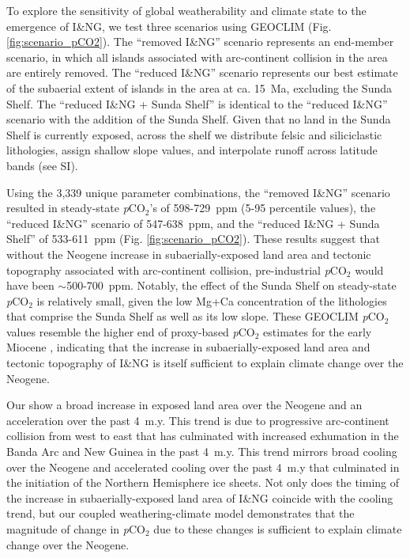 \documentclass[11pt,letterpaper]{article}
\newcommand{\pCOtwo}{\textit{p}CO$_{2}$\xspace}
\begin{document}
To explore the sensitivity of global weatherability and climate state to the emergence of I\&NG, we test three scenarios using GEOCLIM (Fig. \ref{fig:scenario_pCO2}). The ``removed I\&NG'' scenario represents an end-member scenario, in which all islands associated with arc-continent collision in the area are entirely removed. The ``reduced I\&NG'' scenario represents our best estimate of the subaerial extent of islands in the area at ca. 15~Ma, excluding the Sunda Shelf. The ``reduced I\&NG + Sunda Shelf'' is identical to the ``reduced I\&NG'' scenario with the addition of the Sunda Shelf. Given that no land in the Sunda Shelf is currently exposed, across the shelf we distribute felsic and siliciclastic lithologies, assign shallow slope values, and interpolate runoff across latitude bands (see SI).

Using the 3,339 unique parameter combinations, the ``removed I\&NG'' scenario resulted in steady-state \pCOtwo's of 598-729~ppm (5-95 percentile values), the ``reduced I\&NG'' scenario of 547-638~ppm, and the ``reduced I\&NG + Sunda Shelf'' of 533-611~ppm (Fig. \ref{fig:scenario_pCO2}). These results suggest that without the Neogene increase in subaerially-exposed land area and tectonic topography associated with arc-continent collision, pre-industrial \pCOtwo would have been $\sim$500-700~ppm. Notably, the effect of the Sunda Shelf on steady-state \pCOtwo is relatively small, given the low Mg+Ca concentration of the lithologies that comprise the Sunda Shelf as well as its low slope. These GEOCLIM \pCOtwo values resemble the higher end of proxy-based \pCOtwo estimates for the early Miocene \citep{Foster2017a}, indicating that the increase in subaerially-exposed land area and tectonic topography of I\&NG is itself sufficient to explain climate change over the Neogene.

Our  show a broad increase in exposed land area over the Neogene and an acceleration over the past 4~m.y. This trend is due to progressive arc-continent collision from west to east that has culminated with increased exhumation in the Banda Arc and New Guinea in the past 4~m.y. This trend mirrors broad cooling over the Neogene and accelerated cooling over the past 4~m.y that culminated in the initiation of the Northern Hemisphere ice sheets. Not only does the timing of the increase in subaerially-exposed land area of I\&NG coincide with the cooling trend, but our coupled weathering-climate model demonstrates that the magnitude of change in \pCOtwo due to these changes is sufficient to explain climate change over the Neogene.
\end{document}
